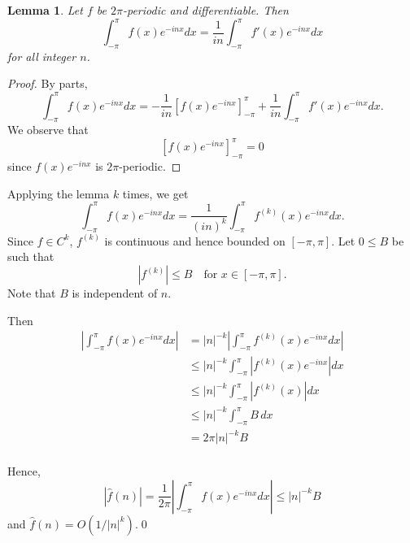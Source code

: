 \documentclass[oneside]{article}
\newcommand\abs[1]{\left|#1\right|}
\newtheorem*{lem}{Lemma}
\begin{document}
  \begin{lem}
    Let $f$ be $2\pi$-periodic and differentiable. Then\[
      \int_{-\pi}^\pi f(x)e^{-inx}dx
      = \frac{1}{in}\int_{-\pi}^\pi f'(x)e^{-inx}dx
    \] for all integer $n$.
  \end{lem}

  \begin{proof}
    By parts,
    \[
      \int_{-\pi}^\pi f(x)e^{-inx}dx
      = -\frac{1}{in}\left[f(x)e^{-inx}\right]_{-\pi}^\pi
      + \frac{1}{in}\int_{-\pi}^\pi f'(x)e^{-inx}dx \text{.}
    \] We observe that \[
      \left[f(x)e^{-inx}\right]_{-\pi}^\pi = 0
    \] since $f(x)e^{-inx}$ is $2\pi$-periodic.
  \end{proof}

  Applying the lemma $k$ times, we get \[
    \int_{-\pi}^\pi f(x)e^{-inx}dx
      = \frac{1}{(in)^k}\int_{-\pi}^\pi f^{(k)}(x)e^{-inx}dx \text{.}
  \] Since $f \in C^k$, $f^{(k)}$ is continuous and hence bounded on
  $[-\pi, \pi]$. Let $0 \leq B$ be such that \[
    \abs{f^{(k)}} \leq B\quad\text{for }x \in [-\pi, \pi] \text{.}
  \] Note that $B$ is independent of $n$.

  Then \begin{align*}
    \abs{\int_{-\pi}^\pi f(x)e^{-inx}dx}
      &= \abs{n}^{-k}\abs{\int_{-\pi}^\pi f^{(k)}(x)e^{-inx}dx} \\
      &\leq \abs{n}^{-k}\int_{-\pi}^\pi \abs{f^{(k)}(x)e^{-inx}}dx \\
      &\leq \abs{n}^{-k}\int_{-\pi}^\pi \abs{f^{(k)}(x)}dx \\
      &\leq \abs{n}^{-k}\int_{-\pi}^\pi B\,dx \\
      &= 2\pi \abs{n}^{-k} B \\
  \end{align*}

  Hence, \[
    \abs{\hat f(n)} = \frac{1}{2\pi}\abs{\int_{-\pi}^\pi f(x)e^{-inx}dx}
    \leq \abs{n}^{-k}B
  \] and $\hat f(n) = O(1/\abs{n}^k)$.\qed
\end{document}

